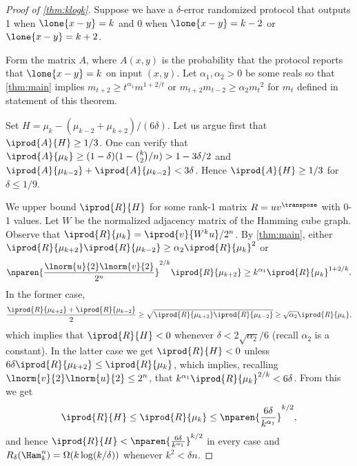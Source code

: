 \begin{proof}[Proof of \autoref{thm:klogk}]
Suppose we have a $\delta$-error randomized protocol that 
outputs 1 when $\lone{x-y} = k$ and 0 when 
$\lone{x-y} = k-2$ or $\lone{x-y} = k+2$.
 
Form the matrix $A$, where $A(x,y)$ is the probability 
that the protocol reports that $\lone{x-y}= k$ on 
input $(x,y)$. Let $\alpha_1,\alpha_2> 0$ be some reals so that
\autoref{thm:main} implies
$m_{t+2}\ge t^{\alpha_1}m^{1+2/t}$ or 
$m_{t+2}m_{t-2}\ge \alpha_2{m_t}^2$ for $m_t$ 
defined in statement of this theorem. 

Set $H = \mu_{k} - (\mu_{k-2} + \mu_{k+2})/(6\delta)$.
Let us argue first that $\iprod{A}{H}\ge 1/3$.
One can verify that 
$\iprod{A}{\mu_k}\ge 
  (1-\delta)(1-\binom{k}{2}/n)> 1-3\delta/2$
and $\iprod{A}{\mu_{k-2}} + \iprod{A}{\mu_{k-2}} < 3\delta$.
Hence $\iprod{A}{H}\ge 1/3$ for $\delta \le 1/9$.

We upper bound $\iprod{R}{H}$ for some rank-1
matrix $R=uv^\transpose$ with 0-1 values. Let $W$ be
the normalized adjacency matrix of the Hamming cube graph.
Observe that $\iprod{R}{\mu_k} = \iprod{v}{W^ku}/2^n$.
By \autoref{thm:main}, either 
$\iprod{R}{\mu_{k+2}}\iprod{R}{\mu_{k-2}}
\ge \alpha_2 \iprod{R}{\mu_k}^2$ or 
\begin{align*}
\nparen{\frac{\lnorm{u}{2}\lnorm{v}{2}}{2^n}}^{2/k}
\iprod{R}{\mu_{k+2}}\ge k^{\alpha_1}\iprod{R}{\mu_{k}}^{1+2/k}.
\end{align*}
In the former case,
\begin{align*}
\frac{\iprod{R}{\mu_{k+2}}+\iprod{R}{\mu_{k-2}}}{2}\ge 
\sqrt{\iprod{R}{\mu_{k+2}}\iprod{R}{\mu_{k-2}}}\ge
\sqrt{\alpha_2}\iprod{R}{\mu_k},
\end{align*}
which implies that $\iprod{R}{H}<0$ whenever 
$\delta<2\sqrt{\alpha_2}/6$ (recall $\alpha_2$ is a constant).
In the latter case we get $\iprod{R}{H}<0$ unless
$6\delta\iprod{R}{\mu_{k+2}} \le \iprod{R}{\mu_{k}}$, 
which implies, 
recalling $\lnorm{v}{2}\lnorm{u}{2}\le 2^n$,
that $k^{\alpha_1}\iprod{R}{\mu_k}^{2/k}<6\delta$.
From this we get
\begin{align*}
  \iprod{R}{H}\le \iprod{R}{\mu_k}\le
  \nparen{\frac{6\delta}{k^{\alpha_1}}}^{k/2},
\end{align*}
and hence $\iprod{R}{H} < \nparen{\frac{6\delta}{k^{\alpha_1}}}^{k/2}$ 
in every case and 
$R_\delta(\Ham^n_k)=\Omega(k\log(k/\delta))$
whenever $k^2<\delta n$.
\end{proof}


